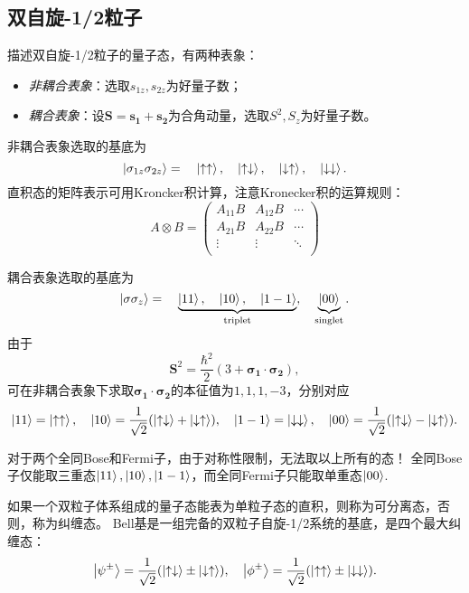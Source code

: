 \subsection{双自旋-1/2粒子}

描述双自旋-1/2粒子的量子态，有两种表象：
\begin{itemize}
    \item \emph{非耦合表象}：选取$s_{1z}, s_{2z}$为好量子数；
    \item \emph{耦合表象}：设$\bm{S}=\bm{s_1}+\bm{s_2}$为合角动量，选取$S^2, S_z$为好量子数。
\end{itemize}

非耦合表象选取的基底为
\begin{equation}
    \ket{\sigma_{1z}\sigma_{2z}} =\quad \ket{\uparrow\uparrow}, \quad \ket{\uparrow\downarrow}, \quad \ket{\downarrow\uparrow}, \quad \ket{\downarrow\downarrow}.
\end{equation}
直积态的矩阵表示可用Kroncker积计算，注意Kronecker积的运算规则：
\begin{equation}
    A \otimes B =
    \begin{pmatrix}
        A_{11}B & A_{12}B & \cdots \\
        A_{21}B & A_{22}B & \cdots \\
        \vdots  & \vdots  & \ddots \\
    \end{pmatrix}
\end{equation}

耦合表象选取的基底为
\begin{equation}
    \ket{\sigma \sigma_z} = \quad \underbrace{\ket{11}, \quad \ket{10}, \quad \ket{1-1}}_{\text{triplet}}, \quad \underbrace{\ket{00}}_{\text{singlet}}.
\end{equation}
由于
\begin{equation}
    \bm{S}^2 = \frac{\hbar^2}{2}(3+\bm{\sigma_1}\cdot\bm{\sigma_2}),
\end{equation}
可在非耦合表象下求取$\bm{\sigma_1}\cdot\bm{\sigma_2}$的本征值为$1,1,1,-3$，分别对应
\begin{equation}
    \ket{11}=\ket{\uparrow\uparrow},\quad \ket{10}=\frac{1}{\sqrt{2}}(\ket{\uparrow\downarrow}+\ket{\downarrow\uparrow}),\quad \ket{1-1}=\ket{\downarrow\downarrow}, \quad \ket{00}=\frac{1}{\sqrt{2}}(\ket{\uparrow\downarrow}-\ket{\downarrow\uparrow}).
\end{equation}

对于两个全同Bose和Fermi子，由于对称性限制，无法取以上所有的态！
全同Bose子仅能取三重态$\ket{11}, \ket{10}, \ket{1-1}$，而全同Fermi子只能取单重态$\ket{00}$.

如果一个双粒子体系组成的量子态能表为单粒子态的直积，则称为可分离态，否则，称为纠缠态。
Bell基是一组完备的双粒子自旋-1/2系统的基底，是四个最大纠缠态：
\begin{equation}
    \ket{\psi^{\pm}}=\frac{1}{\sqrt{2}}(\ket{\uparrow\downarrow}\pm\ket{\downarrow\uparrow}),\quad
    \ket{\phi^{\pm}}=\frac{1}{\sqrt{2}}(\ket{\uparrow\uparrow}\pm\ket{\downarrow\downarrow}).
\end{equation}
